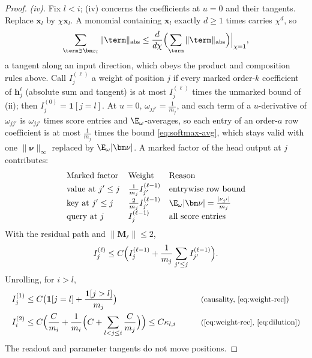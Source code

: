 \begin{proof}
\emph{(iv).} Fix $l<i$; (iv) concerns the coefficients at $u=0$ and their tangents. Replace $\bm x_l$ by $\chi\bm x_l$. A monomial containing $\bm x_l$
exactly $d\ge1$ times carries $\chi^d$, so
\[
 \sum_{\term\ni\bm x_l}\|\term\|_{\mathrm{abs}}\le\frac{d}{d\chi}\Bigl(\sum_{\term}\|\term\|_{\mathrm{abs}}\Bigr)\Big|_{\chi=1},
\]
a tangent along an input direction, which obeys the product and composition rules above. Call $I^{(\ell)}_j$ a weight of position $j$ if every
marked order-$k$ coefficient of $\bm h^\ell_j$ (absolute sum and tangent) is at most $I^{(\ell)}_j$ times the unmarked bound of (ii); then
$I^{(0)}_j=\mathbf 1[j=l]$. At $u=0$, $\omega_{jj'}=\frac{1}{m_j}$, and each term of a $u$-derivative of $\omega_{jj'}$ is $\omega_{jj'}$ times score entries and
$\E_\omega$-averages, so each entry of an order-$a$ row coefficient is at most $\frac{1}{m_j}$ times the bound \cref{eq:softmax-avg}, which stays
valid with one $\|\bm\nu\|_\infty$ replaced by $\E_\omega|\bm\nu|$. A marked factor of the head output at $j$ contributes:
\[
\begin{array}{@{}lll@{}}
 \text{Marked factor} & \text{Weight} & \text{Reason}\\[2pt]
 \text{value at }j'\le j & \frac{1}{m_j}I^{(\ell-1)}_{j'} & \text{entrywise row bound}\\[2pt]
 \text{key at }j'\le j & \frac{2}{m_j}I^{(\ell-1)}_{j'} & \E_\omega|\bm\nu|=\frac{|\nu_{j'}|}{m_j}\\[2pt]
 \text{query at }j & I^{(\ell-1)}_j & \text{all score entries}
\end{array}
\]
With the residual path and $\|\mathbf M_\ell\|\le2$,
\begin{equation}
 I^{(\ell)}_j\le C\Bigl(I^{(\ell-1)}_j+\frac{1}{m_j}\sum_{j'\le j}I^{(\ell-1)}_{j'}\Bigr).
 \label{eq:weight-rec}
\end{equation}
Unrolling, for $i>l$,
\begin{alignat*}{2}
 I^{(1)}_j&\le C\bigl(\mathbf 1[j=l]+\frac{\mathbf 1[j>l]}{m_j}\bigr) &\qquad& \why{causality, \cref{eq:weight-rec}}\\
 I^{(2)}_i&\le C\Bigl(\frac{C}{m_i}+\frac{1}{m_i}\Bigl(C+\sum_{l<j\le i}\frac{C}{m_j}\Bigr)\Bigr)\le C\kappa_{l,i} && \why{\cref{eq:weight-rec}, \cref{eq:dilution}}
\end{alignat*}
The readout and parameter tangents do not move positions.
\end{proof}

